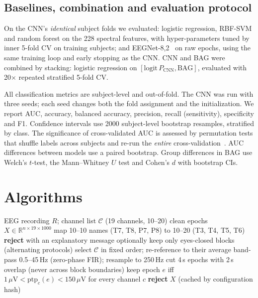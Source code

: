 \documentclass[journal]{IEEEtran}
\begin{document}
\subsection{Baselines, combination and evaluation protocol}
On the CNN's \emph{identical} subject folds we evaluated: logistic regression, RBF-SVM and random forest on the 228 spectral features, with hyper-parameters tuned by inner 5-fold CV on training subjects; and EEGNet-8,2~\cite{eegnet} on raw epochs, using the same training loop and early stopping as the CNN. CNN and BAG were combined by stacking: logistic regression on $[\mathrm{logit}\,P_\mathrm{CNN},\mathrm{BAG}]$, evaluated with 20$\times$ repeated stratified 5-fold CV.

All classification metrics are subject-level and out-of-fold. The CNN was run with three seeds; each seed changes both the fold assignment and the initialization. We report AUC, accuracy, balanced accuracy, precision, recall (sensitivity), specificity and F1. Confidence intervals use 2000 subject-level bootstrap resamples, stratified by class. The significance of cross-validated AUC is assessed by permutation tests that shuffle labels across subjects and re-run the \emph{entire} cross-validation~\cite{ojala2010}. AUC differences between models use a paired bootstrap. Group differences in BAG use Welch's $t$-test, the Mann--Whitney $U$ test and Cohen's $d$ with bootstrap CIs.

\section{Algorithms}

\begin{algorithm}[t]
\caption{Harmonized preprocessing}
\label{alg:pre}
\begin{algorithmic}[1]
\Require EEG recording $R$; channel list $\mathcal{C}$ (19 channels, 10--20)
\Ensure clean epochs $X \in \mathbb{R}^{n\times19\times1000}$
\State map 10--10 names (T7, T8, P7, P8) to 10--20 (T3, T4, T5, T6)
 \State \textbf{reject} with an explanatory message \EndIf
\State optionally keep only eyes-closed blocks (alternating protocols)
\State select $\mathcal{C}$ in fixed order; re-reference to their average
\State band-pass 0.5--45\,Hz (zero-phase FIR); resample to 250\,Hz
\State cut 4\,s epochs with 2\,s overlap (never across block boundaries)
\State keep epoch $e$ iff $1\,\mu\mathrm{V} < \mathrm{ptp}_c(e) < 150\,\mu\mathrm{V}$ for every channel $c$
 \State \textbf{reject} \EndIf
\State \Return $X$ (cached by configuration hash)
\end{algorithmic}
\end{algorithm}
\end{document}
